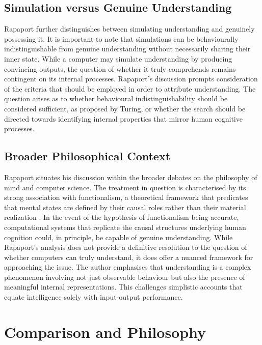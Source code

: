 \documentclass[runningheads]{llncs}
\begin{document}
\subsection{Simulation versus Genuine Understanding}
%
Rapaport further distinguishes between simulating understanding and genuinely possessing it. It is important to note that simulations can be behaviourally indistinguishable from genuine understanding without necessarily sharing their inner state. While a computer may simulate understanding by producing convincing outputs, the question of whether it truly comprehends remains contingent on its internal processes.
Rapaport's discussion prompts consideration of the criteria that should be employed in order to attribute understanding. The question arises as to whether behavioural indistinguishability should be considered sufficient, as proposed by Turing, or whether the search should be directed towards identifying internal properties that mirror human cognitive processes.
%
%
\subsection{Broader Philosophical Context}
%
Rapaport situates his discussion within the broader debates on the philosophy of mind and computer science. The treatment in question is characterised by its strong association with functionalism, a theoretical framework that predicates that mental states are defined by their causal roles rather than their material realization \cite{putnam1967psychological}. In the event of the hypothesis of functionalism being accurate, computational systems that replicate the causal structures underlying human cognition could, in principle, be capable of genuine understanding.
While Rapaport's analysis does not provide a definitive resolution to the question of whether computers can truly understand, it does offer a nuanced framework for approaching the issue. The author emphasises that understanding is a complex phenomenon involving not just observable behaviour but also the presence of meaningful internal representations. This challenges simplistic accounts that equate intelligence solely with input-output performance.
%
%
%
%
\section{Comparison and Philosophy}
\end{document}
